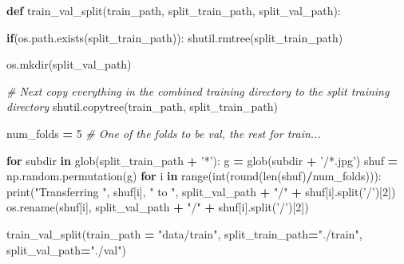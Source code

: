 \documentclass[]{book}
\newenvironment{Shaded}{\begin{snugshade}}{\end{snugshade}}
\newcommand{\KeywordTok}[1]{\textcolor[rgb]{0.13,0.29,0.53}{\textbf{#1}}}
\newcommand{\DecValTok}[1]{\textcolor[rgb]{0.00,0.00,0.81}{#1}}
\newcommand{\StringTok}[1]{\textcolor[rgb]{0.31,0.60,0.02}{#1}}
\newcommand{\CommentTok}[1]{\textcolor[rgb]{0.56,0.35,0.01}{\textit{#1}}}
\newcommand{\ControlFlowTok}[1]{\textcolor[rgb]{0.13,0.29,0.53}{\textbf{#1}}}
\newcommand{\OperatorTok}[1]{\textcolor[rgb]{0.81,0.36,0.00}{\textbf{#1}}}
\newcommand{\BuiltInTok}[1]{#1}
\newcommand{\NormalTok}[1]{#1}
\theoremstyle{definition}
\theoremstyle{definition}
\theoremstyle{definition}
\theoremstyle{remark}
\begin{document}
\begin{Shaded}
\begin{Highlighting}[]
\KeywordTok{def}\NormalTok{ train_val_split(train_path, split_train_path, split_val_path):}
    
    \ControlFlowTok{if}\NormalTok{(os.path.exists(split_train_path)): shutil.rmtree(split_train_path)}

\NormalTok{    os.mkdir(split_val_path)}

    \CommentTok{# Next copy everything in the combined training directory to the split training directory}
\NormalTok{    shutil.copytree(train_path, split_train_path)}

\NormalTok{    num_folds }\OperatorTok{=} \DecValTok{5}  \CommentTok{# One of the folds to be val, the rest for train...}

    \ControlFlowTok{for}\NormalTok{ subdir }\KeywordTok{in}\NormalTok{ glob(split_train_path }\OperatorTok{+} \StringTok{'*'}\NormalTok{):}
\NormalTok{        g }\OperatorTok{=}\NormalTok{ glob(subdir }\OperatorTok{+} \StringTok{'/*.jpg'}\NormalTok{)}
\NormalTok{        shuf }\OperatorTok{=}\NormalTok{ np.random.permutation(g)}
        \ControlFlowTok{for}\NormalTok{ i }\KeywordTok{in} \BuiltInTok{range}\NormalTok{(}\BuiltInTok{int}\NormalTok{(}\BuiltInTok{round}\NormalTok{(}\BuiltInTok{len}\NormalTok{(shuf)}\OperatorTok{/}\NormalTok{num_folds))):}
            \BuiltInTok{print}\NormalTok{(}\StringTok{"Transferring "}\NormalTok{, shuf[i], }\StringTok{" to "}\NormalTok{, }
\NormalTok{                  split_val_path }\OperatorTok{+} \StringTok{"/"} \OperatorTok{+}\NormalTok{ shuf[i].split(}\StringTok{'/'}\NormalTok{)[}\DecValTok{2}\NormalTok{])}
\NormalTok{            os.rename(shuf[i], split_val_path }\OperatorTok{+} \StringTok{"/"} \OperatorTok{+}\NormalTok{ shuf[i].split(}\StringTok{'/'}\NormalTok{)[}\DecValTok{2}\NormalTok{])}
\end{Highlighting}
\end{Shaded}

\begin{Shaded}
\begin{Highlighting}[]
\NormalTok{train_val_split(train_path }\OperatorTok{=} \StringTok{"data/train"}\NormalTok{, split_train_path}\OperatorTok{=}\StringTok{"./train"}\NormalTok{, split_val_path}\OperatorTok{=}\StringTok{"./val"}\NormalTok{)}
\end{Highlighting}
\end{Shaded}
\end{document}
